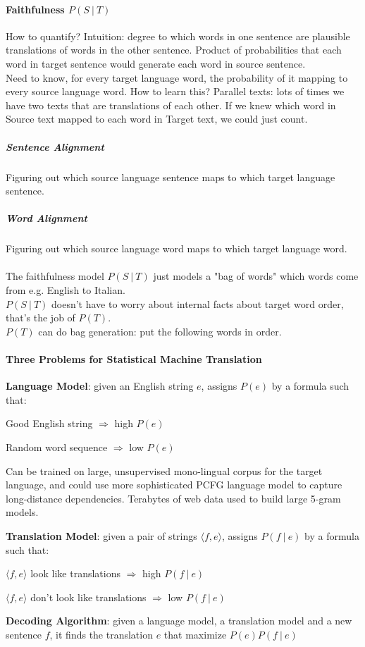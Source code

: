 \documentclass[10pt]{report}
\begin{document}
\paragraph{Faithfulness $P(S\:|\:T)$} How to quantify? Intuition: degree to which words in one sentence are plausible translations of words in the other sentence. Product of probabilities that each word in target sentence would generate each word in source sentence.\\
Need to know, for every target language word, the probability of it mapping to every source language word. How to learn this? Parallel texts: lots of times we have two texts that are translations of each other. If we knew which word in Source text mapped to each word in Target text, we could just count.
\subparagraph{Sentence Alignment} Figuring out which source language sentence maps to which target language sentence.
\subparagraph{Word Alignment} Figuring out which source language word maps to which target language word. \\\\
The faithfulness model $P(S\:|\:T)$ just models a "bag of words" which words come from e.g. English to Italian.\\
$P(S\:|\:T)$ doesn't have to worry about internal facts about target word order, that's the job of $P(T)$.\\
$P(T)$ can do bag generation: put the following words in order.
\paragraph{Three Problems for Statistical Machine Translation}
\begin{list}{}{}
	\item \textbf{Language Model}: given an English string $e$, assigns $P(e)$ by a formula such that:
	\begin{list}{}{}
		\item Good English string $\Rightarrow$ high $P(e)$
		\item Random word sequence $\Rightarrow$ low $P(e)$
	\end{list}
	Can be trained on large, unsupervised mono-lingual corpus for the target language, and could use more sophisticated PCFG language model to capture long-distance dependencies. Terabytes of web data used to build large 5-gram models.
	\item \textbf{Translation Model}: given a pair of strings $\langle f,e\rangle$, assigns $P(f\:|\:e)$ by a formula such that:
	\begin{list}{}{}
		\item $\langle f,e\rangle$ look like translations $\Rightarrow$ high $P(f\:|\:e)$
		\item $\langle f,e\rangle$ don't look like translations $\Rightarrow$ low $P(f\:|\:e)$
	\end{list}
	\item \textbf{Decoding Algorithm}: given a language model, a translation model and a new sentence $f$, it finds the translation $e$ that maximize $P(e)P(f\:|\:e)$
\end{list}
\end{document}
